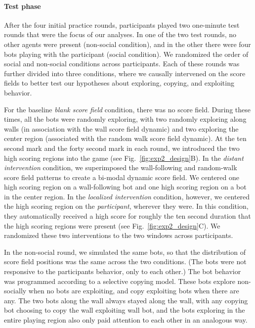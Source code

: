 \documentclass[12pt,letterpaper]{article}
\begin{document}
\paragraph{Test phase}

After the four initial practice rounds, participants played two one-minute test rounds that were the focus of our analyses. 
In one of the two test rounds, no other agents were present (non-social condition), and in the other there were four bots playing with the participant (social condition). 
We randomized the order of social and non-social conditions across participants. 
Each of these rounds was further divided into three conditions, where we causally intervened on the score fields to better test our hypotheses about exploring, copying, and exploiting behavior. 

For the baseline \textit{blank score field} condition, there was no score field. During these times, all the bots were randomly exploring, with two randomly exploring along walls (in association with the wall score field dynamic) and two exploring the center region (associated with the random walk score field dynamic). 
At the ten second mark and the forty second mark in each round, we introduced the two high scoring regions into the game (see Fig.~\ref{fig:exp2_design}B).
In the \textit{distant intervention} condition, we superimposed the wall-following and random-walk score field patterns to create a bi-modal dynamic score field. 
We centered one high scoring region on a wall-following bot and one high scoring region on a bot in the center region. 
In the \textit{localized intervention} condition, however, we centered the high scoring region on the \emph{participant}, wherever they were. In this condition, they automatically received a high score for roughly the ten second duration that the high scoring regions were present (see Fig.~\ref{fig:exp2_design}C).
We randomized these two interventions to the two windows across participants.

In the non-social round, we simulated the same bots, so that the distribution of score field positions was the same across the two conditions. (The bots were not responsive to the participants behavior, only to each other.) The bot behavior was programmed according to a selective copying model. These bots explore non-socially when no bots are exploiting, and copy exploiting bots when there are any. The two bots along the wall always stayed along the wall, with any copying bot choosing to copy the wall exploiting wall bot, and the bots exploring in the entire playing region also only paid attention to each other in an analogous way.
\end{document}
